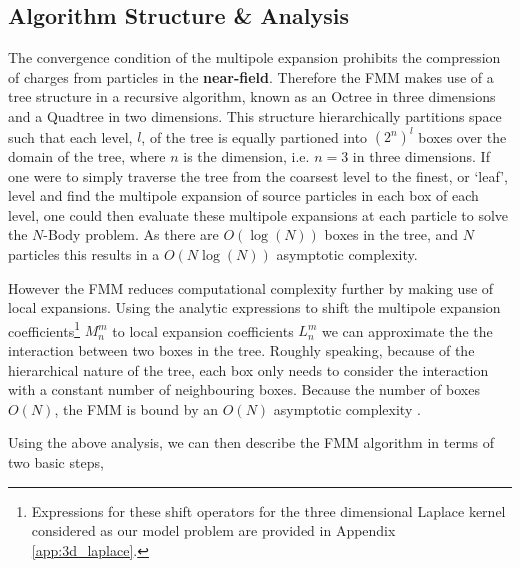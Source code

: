 \hspace{10pt}

\subsection{Algorithm Structure \& Analysis}

The convergence condition of the multipole expansion prohibits the compression
of charges from particles in the \textbf{\gls{near-field}}. Therefore the FMM
makes use of a tree structure in a recursive algorithm, known as an Octree in
three dimensions and a Quadtree in two dimensions. This structure hierarchically
partitions space such that each level, $l$, of the tree is equally partioned into
$(2^n)^l$ boxes over the domain of the tree, where $n$ is the dimension,
i.e. $n=3$ in three dimensions. If one were to simply traverse the tree from
the coarsest level to the finest, or `leaf', level and find the multipole expansion of source
particles in each box of each level, one could then evaluate these multipole expansions
at each particle to solve the $N$-Body problem. As there are $O(\log(N))$
boxes in the tree, and $N$ particles this results in a $O(N\log(N))$ asymptotic
complexity.

However the FMM reduces computational complexity further by making use of local
expansions. Using the analytic expressions to shift the multipole expansion
coefficients\footnote{Expressions for these shift operators for the three dimensional
Laplace kernel considered as our model problem are provided in Appendix \ref{app:3d_laplace}.}
$M_n^m$ to local expansion coefficients $L_n^m$ we can approximate the the interaction
between two boxes in the tree. Roughly speaking, because of the hierarchical
nature of the tree, each box only needs to consider the interaction with a
constant number of neighbouring boxes. Because the number of boxes $O(N)$,
the FMM is bound by an $O(N)$ asymptotic complexity \cite{Hwu:2011:MKP}.

Using the above analysis, we can then describe the FMM algorithm in terms of
two basic steps,

